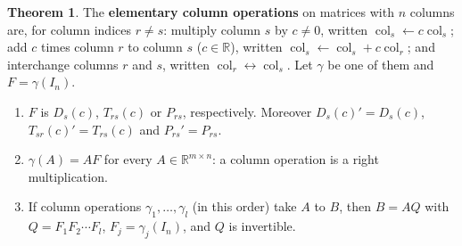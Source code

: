 \documentclass[12pt]{article}
\newcommand{\R}{\mathbb R}
\DeclareMathOperator{\col}{col}
\theoremstyle{definition}
\newtheorem{theorem}{Theorem}
\begin{document}
\begin{theorem}\label{r2-thm-column-ops}
The \textbf{elementary column operations} on matrices with \(n\) columns are, for column indices \(r\ne s\):
multiply column \(s\) by \(c\ne0\), written \(\col_s\leftarrow c\col_s\); add \(c\) times column \(r\) to column \(s\)
(\(c\in\R\)), written \(\col_s\leftarrow\col_s+c\col_r\); and interchange columns \(r\) and \(s\), written
\(\col_r\leftrightarrow\col_s\). Let \(\gamma\) be one of them and \(F=\gamma(I_n)\).
\begin{enumerate}
\item \(F\) is \(D_s(c)\), \(T_{rs}(c)\) or \(P_{rs}\), respectively. Moreover \(D_s(c)'=D_s(c)\),
\(T_{sr}(c)'=T_{rs}(c)\) and \(P_{rs}'=P_{rs}\).
\item \(\gamma(A)=AF\) for every \(A\in\R^{m\times n}\): a column operation is a right multiplication.
\item If column operations \(\gamma_1,\dots,\gamma_l\) (in this order) take \(A\) to \(B\), then \(B=AQ\) with
\(Q=F_1F_2\cdots F_l\), \(F_j=\gamma_j(I_n)\), and \(Q\) is invertible.
\end{enumerate}
\end{theorem}
\end{document}
